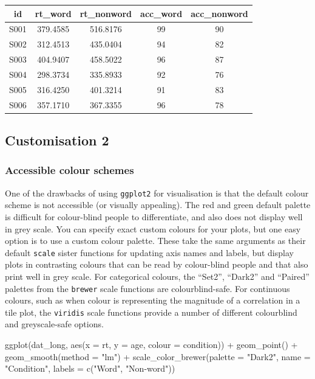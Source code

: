 \documentclass[
  english,
  doc,floatsintext]{apa6}
\newenvironment{Shaded}{\begin{snugshade}}{\end{snugshade}}
\newcommand{\AttributeTok}[1]{\textcolor[rgb]{0.77,0.63,0.00}{#1}}
\newcommand{\FunctionTok}[1]{\textcolor[rgb]{0.00,0.00,0.00}{#1}}
\newcommand{\NormalTok}[1]{#1}
\newcommand{\SpecialCharTok}[1]{\textcolor[rgb]{0.00,0.00,0.00}{#1}}
\newcommand{\StringTok}[1]{\textcolor[rgb]{0.31,0.60,0.02}{#1}}
\begin{document}
\begin{tabular}{c|c|c|c|c}
\hline
id & rt\_word & rt\_nonword & acc\_word & acc\_nonword\\
\hline
S001 & 379.4585 & 516.8176 & 99 & 90\\
\hline
S002 & 312.4513 & 435.0404 & 94 & 82\\
\hline
S003 & 404.9407 & 458.5022 & 96 & 87\\
\hline
S004 & 298.3734 & 335.8933 & 92 & 76\\
\hline
S005 & 316.4250 & 401.3214 & 91 & 83\\
\hline
S006 & 357.1710 & 367.3355 & 96 & 78\\
\hline
\end{tabular}

\hypertarget{customisation-2}{%
\subsection{Customisation 2}\label{customisation-2}}

\hypertarget{accessible-colour-schemes}{%
\subsubsection{Accessible colour schemes}\label{accessible-colour-schemes}}

One of the drawbacks of using \texttt{ggplot2} for visualisation is that the default colour scheme is not accessible (or visually appealing). The red and green default palette is difficult for colour-blind people to differentiate, and also does not display well in grey scale. You can specify exact custom colours for your plots, but one easy option is to use a custom colour palette. These take the same arguments as their default \texttt{scale} sister functions for updating axis names and labels, but display plots in contrasting colours that can be read by colour-blind people and that also print well in grey scale. For categorical colours, the ``Set2'', ``Dark2'' and ``Paired'' palettes from the \texttt{brewer} scale functions are colourblind-safe. For continuous colours, such as when colour is representing the magnitude of a correlation in a tile plot, the \texttt{viridis} scale functions provide a number of different colourblind and greyscale-safe options.

\begin{Shaded}
\begin{Highlighting}[]
\FunctionTok{ggplot}\NormalTok{(dat\_long, }\FunctionTok{aes}\NormalTok{(}\AttributeTok{x =}\NormalTok{ rt, }\AttributeTok{y =}\NormalTok{ age, }\AttributeTok{colour =}\NormalTok{ condition)) }\SpecialCharTok{+}
  \FunctionTok{geom\_point}\NormalTok{() }\SpecialCharTok{+}
  \FunctionTok{geom\_smooth}\NormalTok{(}\AttributeTok{method =} \StringTok{"lm"}\NormalTok{) }\SpecialCharTok{+}
  \FunctionTok{scale\_color\_brewer}\NormalTok{(}\AttributeTok{palette =} \StringTok{"Dark2"}\NormalTok{,}
                     \AttributeTok{name =} \StringTok{"Condition"}\NormalTok{,}
                     \AttributeTok{labels =} \FunctionTok{c}\NormalTok{(}\StringTok{"Word"}\NormalTok{, }\StringTok{"Non{-}word"}\NormalTok{))}
\end{Highlighting}
\end{Shaded}
\end{document}
